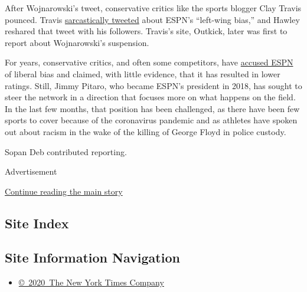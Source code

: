 After Wojnarowski's tweet, conservative critics like the sports blogger
Clay Travis pounced. Travis
\href{https://twitter.com/ClayTravis/status/1281623169678422016}{sarcastically
tweeted} about ESPN's ``left-wing bias,'' and Hawley reshared that tweet
with his followers. Travis's site, Outkick, later was first to report
about Wojnarowski's suspension.

For years, conservative critics, and often some competitors, have
\href{https://www.nytimes3xbfgragh.onion/2017/05/01/sports/espn-layoffs-sports-politics-bias.html}{accused
ESPN} of liberal bias and claimed, with little evidence, that it has
resulted in lower ratings. Still, Jimmy Pitaro, who became ESPN's
president in 2018, has sought to steer the network in a direction that
focuses more on what happens on the field. In the last few months, that
position has been challenged, as there have been few sports to cover
because of the coronavirus pandemic and as athletes have spoken out
about racism in the wake of the killing of George Floyd in police
custody.

Sopan Deb contributed reporting.

Advertisement

\protect\hyperlink{after-bottom}{Continue reading the main story}

\hypertarget{site-index}{%
\subsection{Site Index}\label{site-index}}

\hypertarget{site-information-navigation}{%
\subsection{Site Information
Navigation}\label{site-information-navigation}}

\begin{itemize}
\tightlist
\item
  \href{https://help.nytimes3xbfgragh.onion/hc/en-us/articles/115014792127-Copyright-notice}{©~2020~The
  New York Times Company}
\end{itemize}

